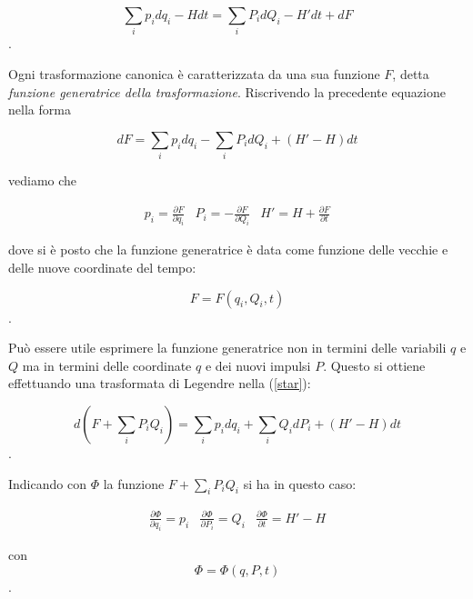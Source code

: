 \documentclass[a4paper,12pt,oneside]{book}
\begin{document}
\begin{equation}
\sum_i p_i dq_i - Hdt = \sum_i P_i d Q_i - H'dt + dF
\end{equation}.

Ogni trasformazione canonica \`e caratterizzata da una sua funzione $F$, detta \textit{funzione generatrice della trasformazione}.
Riscrivendo la precedente equazione nella forma

\begin{equation}
dF = \sum_i p_i d q_i - \sum_i P_i dQ_i + (H'-H)dt
\label{star}
\end{equation}

vediamo che

\begin{equation}
\begin{matrix}

p_i = \frac{\partial F}{\partial q_i} & P_i = - \frac{\partial F}{\partial Q_i} & H' = H + \frac{\partial F}{\partial t}

\end{matrix}
\label{o}
\end{equation}

dove si \`e posto che la funzione generatrice \`e data come funzione delle vecchie e delle nuove coordinate del tempo:

\begin{equation}
F = F(q_i, Q_i,t)
\end{equation}.

Pu\`o essere utile esprimere la funzione generatrice non in termini delle variabili $q$ e $Q$ ma in termini delle coordinate $q$ e dei nuovi impulsi $P$. Questo si ottiene effettuando una trasformata di Legendre nella (\ref{star}):

\begin{equation}
d(F+\sum_i P_iQ_i) = \sum_i p_i dq_i + \sum_i Q_i dP_i + (H'-H)dt
\end{equation}.

Indicando con $\Phi$ la funzione $F+\sum_iP_i Q_i $ si ha in questo caso:

\begin{equation}
\begin{matrix}

\frac{\partial \Phi}{\partial q_i} = p_i & \frac{\partial \Phi}{\partial P_i} = Q_i & \frac{\partial \Phi}{\partial t} = H'- H

\end{matrix}
\label{oo}
\end{equation}

con
\begin{equation}
\Phi = \Phi (q,P,t)
\end{equation}.
\end{document}
